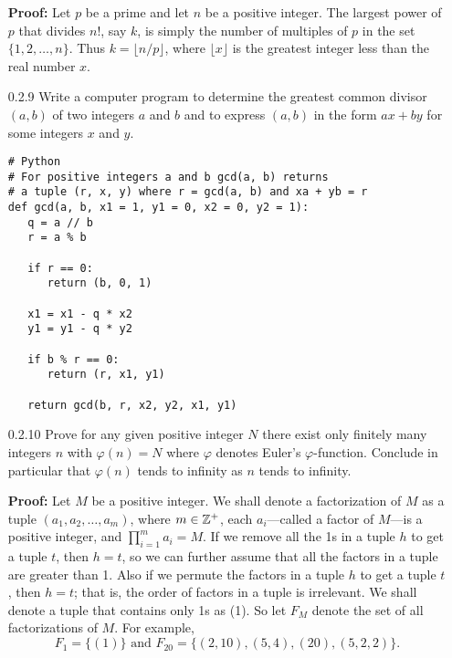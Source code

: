 \begin{enumerate}
      \textbf{Proof:} Let $p$ be a prime and let $n$ be a positive integer. The
      largest power of $p$ that divides $n!$, say $k$, is simply the number of 
      multiples of $p$ in the set $\{1, 2, \ldots, n\}$. Thus
      $k = \lfloor{n/p}\rfloor$, where $\lfloor{x}\rfloor$ is the greatest
      integer less than the real number $x$.
   \item[0.2.9]   Write a computer program to determine the greatest common
                  divisor $(a, b)$ of two integers $a$ and $b$ and to express
                  $(a, b)$ in the form $ax + by$ for some integers $x$ and $y$.

   \begin{verbatim}
# Python
# For positive integers a and b gcd(a, b) returns
# a tuple (r, x, y) where r = gcd(a, b) and xa + yb = r
def gcd(a, b, x1 = 1, y1 = 0, x2 = 0, y2 = 1):
   q = a // b
   r = a % b

   if r == 0:
      return (b, 0, 1)

   x1 = x1 - q * x2
   y1 = y1 - q * y2

   if b % r == 0:
      return (r, x1, y1)

   return gcd(b, r, x2, y2, x1, y1)
   \end{verbatim}
   \item[0.2.10]  Prove for any given positive integer $N$ there exist only
                  finitely many integers $n$ with $\varphi(n) = N$ where
                  $\varphi$ denotes Euler's $\varphi$-function. Conclude in 
                  particular that $\varphi(n)$ tends to infinity as $n$ tends to
                  infinity.

      \textbf{Proof:} Let $M$ be a positive integer. We shall denote a 
      factorization of $M$ as a tuple $(a_1, a_2, \ldots, a_m)$, where
      $m \in \mathbb{Z}^+$, each $a_i$---called a factor of $M$---is a positive integer,
      and $\prod_{i=1}^m a_i = M$. If we remove all the 1s in a tuple $h$ to get
      a tuple $t$, then $h = t$, so we can further assume that all the factors 
      in a tuple are greater than 1. Also if we permute the factors in a tuple 
      $h$ to get a tuple $t$, then $h = t$; that is, the order of factors in a 
      tuple is irrelevant. We shall denote a tuple that contains only 1s as (1).
      So let $F_M$ denote the set of all factorizations of $M$. For example,
      $$F_1 = \{(1)\} \text{ and }
        F_{20} = \{(2, 10), (5, 4), (20), (5, 2, 2)\}.$$


\end{enumerate}

